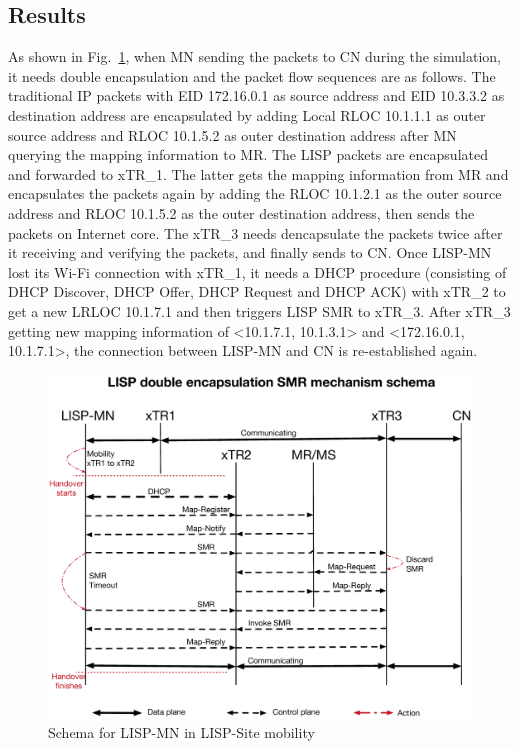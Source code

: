 \subsection{Results}
\label{sec:ns3_results_lispmn_xTR}
As shown in Fig.~\ref{sim_schema_LISPMN_xTR}, when MN sending the packets to CN during the simulation, it needs double encapsulation and the packet flow sequences are as follows. The traditional IP packets with EID 172.16.0.1 as source address and EID 10.3.3.2 as destination address are encapsulated by adding Local RLOC 10.1.1.1 as outer source address and RLOC 10.1.5.2 as outer destination address after MN querying the mapping information to MR. The LISP packets are encapsulated and forwarded to xTR\_1. The latter gets the mapping information from MR and encapsulates the packets again by adding the RLOC 10.1.2.1 as the outer source address and RLOC 10.1.5.2 as the outer destination address, then sends the packets on Internet core. The xTR\_3 needs dencapsulate the packets twice after it receiving and verifying the packets, and finally sends to CN. Once LISP-MN lost its Wi-Fi connection with xTR\_1, it needs a DHCP procedure (consisting of DHCP Discover, DHCP Offer, DHCP Request and DHCP ACK) with xTR\_2 to get a new LRLOC 10.1.7.1 and then triggers LISP SMR to xTR\_3. After xTR\_3 getting new mapping information of <10.1.7.1, 10.1.3.1> and <172.16.0.1, 10.1.7.1>, the connection between LISP-MN and CN is re-established again.
\begin{figure}[!th]
	\centering
	\includegraphics[width=\textwidth]{Pics/Mobility_LISPMN_xTR_schema_SMR_simplify}
	\caption{Schema for LISP-MN in LISP-Site mobility}
	\label{sim_schema_LISPMN_xTR}
\end{figure}

